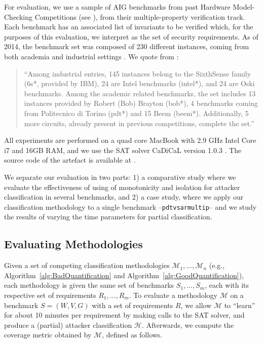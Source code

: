{For evaluation, we use a sample of AIG benchmarks from past Hardware Model-Checking Competitions (see \cite{HWMCC2011,HWMCC2013}), from their multiple-property verification track. Each benchmark has an associated list of invariants to be verified which, for the purposes of this evaluation, we interpret as the set of security requirements. As of 2014, the benchmark set was composed of 230 different instances, coming from both academia and industrial settings \cite{HWMCC2014BM}. We quote from \cite{HWMCC2014BM}:
\begin{quote}
``Among industrial entries, 145 instances
belong to the SixthSense family (6s*, provided by IBM), 24 are Intel benchmarks (intel*),
and 24 are Oski benchmarks. Among the academic related benchmarks, the set includes 13
instances provided by Robert (Bob) Brayton (bob*), 4 benchmarks coming from Politecnico
di Torino (pdt*) and 15 Beem (beem*). Additionally, 5 more circuits, already present in
previous competitions, complete the set.''
\end{quote}
All experiments are performed on a quad core MacBook with 2.9 GHz Intel Core i7 and 16GB RAM, and we use the SAT solver CaDiCaL version 1.0.3 \cite{Cadical}. The source code of the artefact is available at \cite{aig-ac-asset}.

We separate our evaluation in two parts: 1) a comparative study where we evaluate the effectiveness of using of monotonicity and isolation for attacker classification in several benchmarks, and 2) a case study, where we apply our classification methodology to a single benchmark --\texttt{pdtvsarmultip}-- and we study the results of varying the time parameters for partial classification.

\subsection{Evaluating Methodologies}
Given a set of competing classification methodologies $\mathcal{M}_1,\ldots, \mathcal{M}_n$ (e.g., Algorithm~\ref{alg:BadQuantification} and Algorithm~\ref{alg:GoodQuantification}), each methodology is given the same set of benchmarks $S_1,\ldots, S_m$, each with its respective set of requirements $R_1, \ldots, R_m$. To evaluate a methodology $\mathcal{M}$ on a benchmark $S=(W,V,G)$ with a set of requirements $R$, we allow $\mathcal{M}$ to ``learn'' for about 10 minutes per requirement by making calls to the SAT solver, and produce a (partial) attacker classification $\mathcal{H}$.  Afterwards, we compute the coverage metric obtained by $\mathcal{M}$, defined as follows.

}
